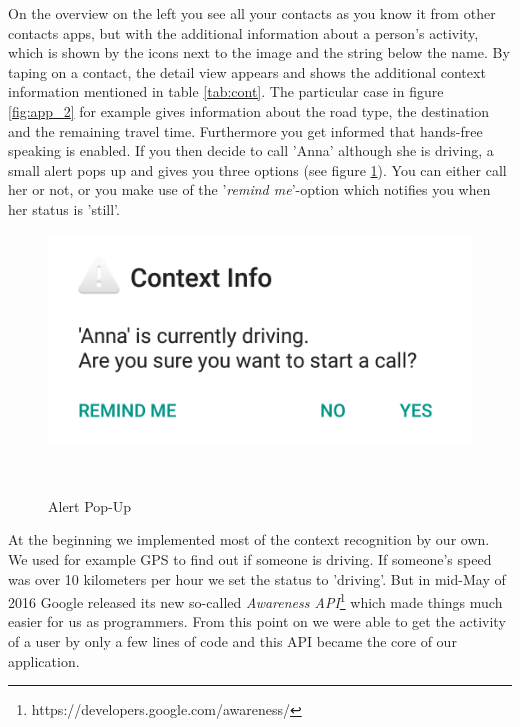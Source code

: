 \documentclass{sigchi}
\begin{document}
On the overview on the left you see all your contacts as you know it from other contacts apps, but with the additional information about a person's activity, which is shown by the icons next to the image and the string below the name. By taping on a contact, the detail view appears and shows the additional context information mentioned in table \ref{tab:cont}. The particular case in figure \ref{fig:app_2} for example gives information about the road type, the destination and the remaining travel time. Furthermore you get informed that hands-free speaking is enabled. If you then decide to call 'Anna' although she is driving, a small alert pops up and gives you three options (see figure \ref{fig:app_3}). You can either call her or not, or you make use of the '\textit{remind me}'-option which notifies you when her status is 'still'.
\begin{figure}[H]
  \centering
  \includegraphics[width=.55\columnwidth]{figures/app_3}
  \caption{Alert Pop-Up}~\label{fig:app_3}
\end{figure}
At the beginning we implemented most of the context recognition by our own. We used for example GPS to find out if someone is driving. If someone's speed was over 10 kilometers per hour we set the status to 'driving'. But in mid-May of 2016 Google released its new so-called \textit{Awareness API}\footnote{https://developers.google.com/awareness/} which made things much easier for us as programmers. From this point on we were able to get the activity of a user by only a few lines of code and this API became the core of our application.
\end{document}
